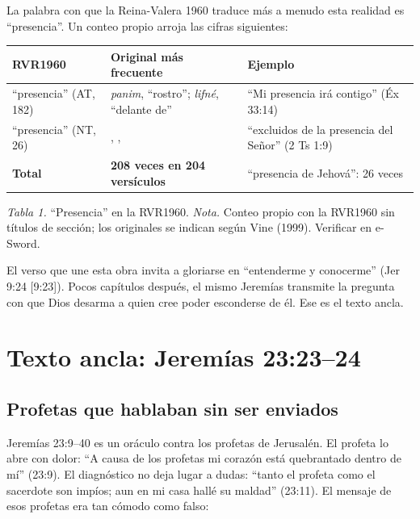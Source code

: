 La palabra con que la Reina-Valera 1960 traduce más a menudo esta realidad es ``presencia''. Un conteo propio arroja las cifras siguientes:

\begin{center}\small\renewcommand{\arraystretch}{1.18}
\begin{tabular}{@{}L{3.2cm}L{5.0cm}L{5.8cm}@{}}
\toprule
\textbf{RVR1960} & \textbf{Original más frecuente} & \textbf{Ejemplo} \\ \midrule
``presencia'' (AT, 182) &  \emph{panim}, ``rostro'';  \emph{lifné}, ``delante de'' & ``Mi presencia irá contigo'' (Éx 33:14) \\
``presencia'' (NT, 26) & , ,  & ``excluidos de la presencia del Señor'' (2 Ts 1:9) \\ \midrule
\textbf{Total} & \textbf{208 veces en 204 versículos} & ``presencia de Jehová'': 26 veces \\
\bottomrule
\end{tabular}\par
{\footnotesize\color{gris}\textit{Tabla 1.} ``Presencia'' en la RVR1960. \textit{Nota.} Conteo propio con la RVR1960 sin títulos de sección; los originales se indican según Vine (1999). Verificar en e-Sword.}
\end{center}

El verso que une esta obra invita a gloriarse en ``entenderme y conocerme'' (Jer 9:24 [9:23]). Pocos capítulos después, el mismo Jeremías transmite la pregunta con que Dios desarma a quien cree poder esconderse de él. Ese es el texto ancla.

\section{Texto ancla: Jeremías 23:23--24}

\subsection{Profetas que hablaban sin ser enviados}

Jeremías 23:9--40 es un oráculo contra los profetas de Jerusalén. El profeta lo abre con dolor: ``A causa de los profetas mi corazón está quebrantado dentro de mí'' (23:9). El diagnóstico no deja lugar a dudas: ``tanto el profeta como el sacerdote son impíos; aun en mi casa hallé su maldad'' (23:11). El mensaje de esos profetas era tan cómodo como falso:


